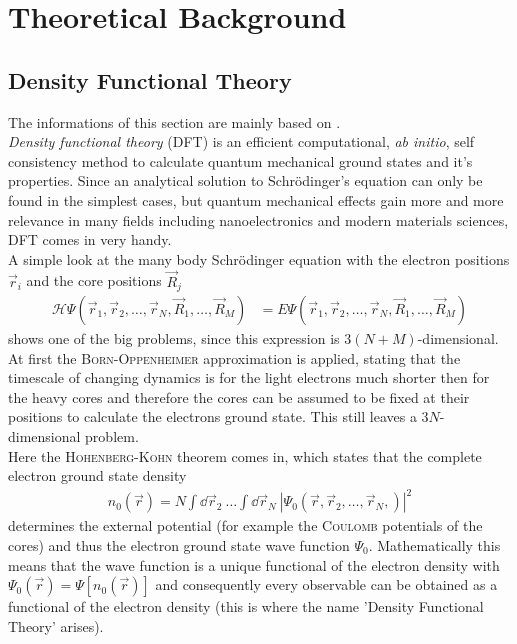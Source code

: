 \section{Theoretical Background}

\subsection{Density Functional Theory}
The informations of this section are mainly based on \cite{KOSKINEN2009237,1402-4896-2004-T109-001}.\\
\emph{Density functional theory} (DFT) is an efficient computational, \emph{ab initio}, self consistency method to calculate quantum mechanical ground states and it's properties. Since an analytical solution to Schrödinger's equation can only be found in the simplest cases, but quantum mechanical effects gain more and more relevance in many fields including nanoelectronics and modern materials sciences, DFT comes in very handy.\\
A simple look at the many body Schrödinger equation with the electron positions $\vec{r}_i$ and the core positions $\vec{R}_j$
\begin{align}
	\mathcal{H} \Psi\left(\vec{r}_1,\vec{r}_2,\dots,\vec{r}_N,\vec{R}_1,\dots,\vec{R}_M\right) &= E \Psi\left(\vec{r}_1,\vec{r}_2,\dots,\vec{r}_N,\vec{R}_1,\dots,\vec{R}_M\right)
\end{align}
shows one of the big problems, since this expression is $3(N+M)$-dimensional.
At first the \textsc{Born-Oppenheimer} approximation is applied, stating that the timescale of changing dynamics is for the light electrons much shorter then for the heavy cores and therefore the cores can be assumed to be fixed at their positions to calculate the electrons ground state. This still leaves a $3N$-dimensional problem.\\
Here the \textsc{Hohenberg-Kohn} theorem comes in, which states that the complete electron ground state density
\begin{align}
n_0\left(\vec{r}\right) = N\int\dd\vec{r}_2\ \dots\int\dd\vec{r}_N\ \left|\Psi_0\left(\vec{r}, \vec{r}_2, \dots,\vec{r}_N,\right)\right|^2
\end{align}
determines the external potential (for example the \textsc{Coulomb} potentials of the cores) and thus the electron ground state wave function $\Psi_0$. Mathematically this means that the wave function is a unique functional of the electron density with $\Psi_0\left(\vec{r}\right) = \Psi\left[n_0\left(\vec{r}\right)\right]$ and consequently every observable can be obtained as a functional of the electron density (this is where the name 'Density Functional Theory' arises).\\
